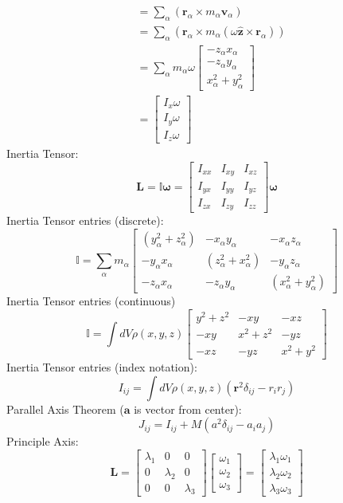 \documentclass{article}
\renewcommand{\v}[1]{\ensuremath{\mathbf{#1}}} %
\renewcommand{\=}[1]{\stackrel{#1}{=}} %
\newcommand{\zhat}{\hat{\v{z}}}
\providecommand{\II}{\mathbb{I}}
\newcommand\m[1]{\begin{bmatrix}#1\end{bmatrix}}
\begin{document}
\begin{multicols}{4}
\begin{equation}
\begin{split}
				&= \sum_\alpha (\v{r}_{\alpha} \times m_\alpha\v{v}_\alpha) \\
				&= \sum_\alpha (\v{r}_{\alpha} \times m_\alpha(\omega\zhat \times \v{r}_\alpha)) \\
				&= \sum_\alpha m_\alpha\omega\m{-z_\alpha x_\alpha \\ -z_\alpha y_\alpha \\ x_\alpha^2 + y_\alpha^2} \\
				&= \m{I_x \omega \\ I_{y}\omega \\ I_z \omega}
			\end{split}
		\end{equation}
		Inertia Tensor:
		\begin{equation}
			\v{L} = \II \bm{\omega} = \m{I_{xx} & I_{xy} & I_{xz} \\ I_{yx} & I_{yy} & I_{yz} \\ I_{zx} & I_{zy} & I_{zz}}\bm{\omega}
		\end{equation}
		Inertia Tensor entries (discrete):
		\[\II = \sum_\alpha m_\alpha \m{(y_\alpha^2 + z_\alpha^2) & - x_\alpha y_\alpha & -x_\alpha z_\alpha
			\\ -y_\alpha x_\alpha & (z_\alpha^2 + x_\alpha^2) & -y_\alpha z_\alpha
			\\ -z_\alpha x_\alpha & -z_\alpha y_\alpha & (x_\alpha^2 + y_\alpha^2)}\]
		Inertia Tensor entries (continuous)
		\[\II = \int dV\rho(x, y, z)\m{y^2 + z^2 & -xy & -xz \\ -xy & x^2 + z^2 & -yz \\ -xz & -yz & x^2 + y^2
		}\]
		Inertia Tensor entries (index notation):
		\begin{equation}
			I_{ij} = \int dV\rho(x, y, z)\left(\v{r}^2\delta_{ij} - r_ir_j\right)
		\end{equation}
		Parallel Axis Theorem ($\v{a}$ is vector from center):
		\begin{equation}
			J_{ij} = I_{ij} + M(a^2\delta_{ij} - a_ia_j)
		\end{equation}
		Principle Axis:
		\begin{equation}
			\v{L} = \m{\lambda_1 & 0 & 0 \\ 0 & \lambda_2 & 0 \\ 0 & 0 & \lambda_3}\m{\omega_1 \\ \omega_2 \\ \omega_3} = \m{\lambda_1\omega_1 \\ \lambda_2\omega_2 \\ \lambda_3\omega_3}
		\end{equation}

\end{multicols}
\end{document}
